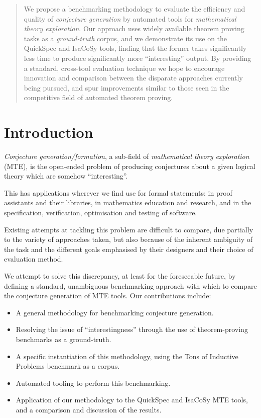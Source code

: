 \begin{abstract}
  We propose a benchmarking methodology to evaluate the efficiency and quality
  of \emph{conjecture generation} by automated tools for \emph{mathematical
    theory exploration}. Our approach uses widely available theorem proving
  tasks as a \emph{ground-truth} corpus, and we demonstrate its use on the
  QuickSpec and IsaCoSy tools, finding that the former takes significantly less
  time to produce significantly more ``interesting'' output. By providing a
  standard, cross-tool evaluation technique we hope to encourage innovation and
  comparison between the disparate approaches currently being pursued, and spur
  improvements similar to those seen in the competitive field of automated
  theorem proving.
\end{abstract}

\section{Introduction}
\label{intro}


\emph{Conjecture generation/formation}, a sub-field of \emph{mathematical theory
  exploration} (MTE), is the open-ended problem of producing conjectures about a
given logical theory which are somehow ``interesting''.

This has applications wherever we find use for formal statements: in proof
assistants and their libraries, in mathematics education and research, and in
the specification, verification, optimisation and testing of software.

Existing attempts at tackling this problem are difficult to compare, due
partially to the variety of approaches taken, but also because of the inherent
ambiguity of the task and the different goals emphasised by their designers and
their choice of evaluation method.

We attempt to solve this discrepancy, at least for the foreseeable future, by
defining a standard, unambiguous benchmarking approach with which to compare
the conjecture generation of MTE tools. Our contributions include:

\begin{itemize}
\item A general methodology for benchmarking conjecture generation.
\item Resolving the issue of ``interestingness'' through the use of
  theorem-proving benchmarks as a ground-truth.
\item A specific instantiation of this methodology, using the Tons of Inductive
  Problems benchmark as a corpus.
\item Automated tooling to perform this benchmarking.
\item Application of our methodology to the QuickSpec and IsaCoSy MTE tools,
  and a comparison and discussion of the results.
\end{itemize}

